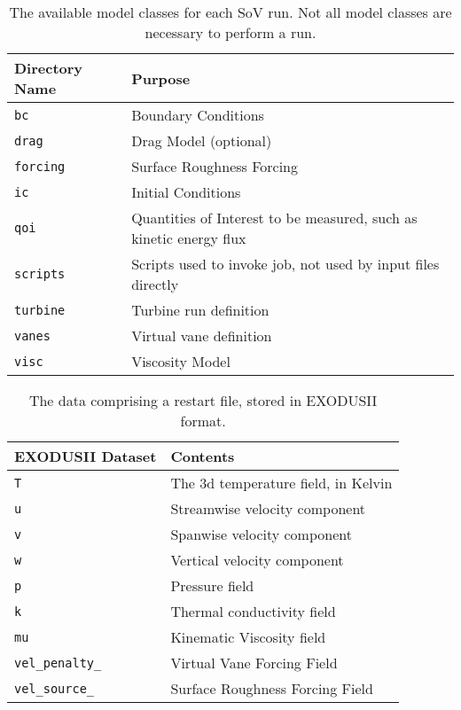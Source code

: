\begin{table}
\centering
\caption{%
  The available model classes for each SoV run. Not all model classes
 are necessary to perform a run.\label{tbl:run}
}
\begin{small}
\begin{tabular}{p{}|p{}}
Directory Name & Purpose \\ \hline \hline
 \texttt{bc}       & Boundary Conditions \\
 \texttt{drag}       & Drag Model (optional) \\
 \texttt{forcing}       & Surface Roughness Forcing \\
 \texttt{ic}       & Initial Conditions \\
 \texttt{qoi}       & Quantities of Interest to be measured, such as
     kinetic energy flux \\
 \texttt{scripts}       & Scripts used to invoke job, not used by input
     files directly \\
 \texttt{turbine}       & Turbine run definition \\
 \texttt{vanes}       & Virtual vane definition \\
 \texttt{visc}       & Viscosity Model \\
\end{tabular}
\end{small}
\end{table}



\begin{table}
\centering
\caption[Instantaneous fields and other details comprising a restart file]{%
  The data comprising a restart file, stored in EXODUSII
 format.\label{tbl:EXO}
}
\begin{small}
\begin{tabular}{p{}|p{}}
EXODUSII Dataset & Contents \\ \hline \hline
\texttt{T                     } & The 3d temperature field, in Kelvin \\
\texttt{u                     } & Streamwise velocity component \\ 
\texttt{v                     } & Spanwise velocity component \\ 
\texttt{w                     } & Vertical velocity component \\ 
\texttt{p                     } & Pressure field \\ 
\texttt{k                     } & Thermal conductivity field \\ 
\texttt{mu                    } & Kinematic Viscosity field \\ 
\texttt{vel\_penalty\_        } & Virtual Vane Forcing Field \\ 
\texttt{vel\_source\_        }  & Surface Roughness Forcing Field 
\end{tabular}
\end{small}
\end{table}

